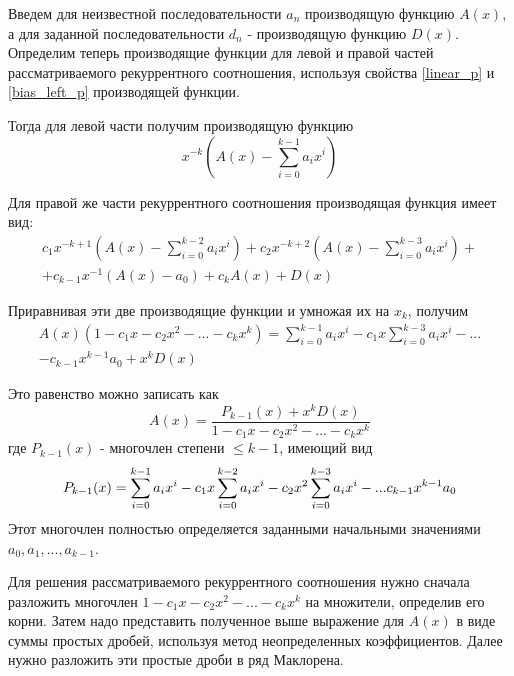 Введем для неизвестной последовательности $a_n$ производящую функцию $A(x)$, а для заданной
последовательности $d_n$ - производящую функцию $D(x)$. Определим теперь производящие функции для
левой и правой частей рассматриваемого рекуррентного соотношения, используя свойства \ref{linear_p} и \ref{bias_left_p} производящей
функции.

Тогда для левой части получим производящую функцию 
\begin{equation*}
    x^{-k}\left(A(x) - \sum_{i = 0}^{k-1} a_i x^i\right)
\end{equation*}

Для правой же части рекуррентного соотношения производящая функция имеет вид:
\begin{multline*}
    c_1 x^{-k+1}\left(A(x) - \sum_{i = 0}^{k-2} a_i x^i\right) + c_2 x^{-k+2}\left(A(x) - \sum_{i = 0}^{k-3} a_i x^i \right) + \\
    + c_{k-1}x^{-1}(A(x) - a_0) + c_k A(x) + D(x)
\end{multline*}

Приравнивая эти две производящие функции и умножая их на $x_k$, получим
\begin{eqnarray*}
    A(x)(1 - c_1x - c_2 x^2 - ... - c_k x^k) = \sum_{i = 0}^{k-1} a_i x^i - c_1 x \sum_{i = 0}^{k-3} a_i x^i - ... \\
    - c_{k-1}x^{k-1}a_0 + x^k D(x)
\end{eqnarray*}

Это равенство можно записать как
\begin{equation}
    \label{gen_func_rec}
    A(x) = \frac{P_{k-1}(x) + x^k D(x)}{1 - c_1 x - c_2 x^2 - ... - c_k x^k}
\end{equation}
где $P_{k-1}(x)$ - многочлен степени $\leq k - 1$, имеющий вид 
\begin{equation}
    \label{p_k}
    P_{k-1}(x) = \sum_{i = 0}^{k - 1}a_i x^i - c_1 x \sum_{i = 0}^{k-2}a_i x^i - c_2 x^2\sum_{i = 0}^{k-3} a_i x^i - ... \\
    c_{k-1} x^{k-1}a_0 
\end{equation}
Этот многочлен полностью определяется заданными начальными значениями $a_0, a_1, ..., a_{k-1}$.

Для решения рассматриваемого рекуррентного соотношения нужно сначала разложить многочлен 
$1 - c_1x - c_2x^2 - ... - c_k x^k$ на множители, определив его корни. Затем надо представить полученное
выше выражение для $A(x)$ в виде суммы простых дробей, используя метод неопределенных коэффициентов. Далее нужно разложить
эти простые дроби в ряд Маклорена.

